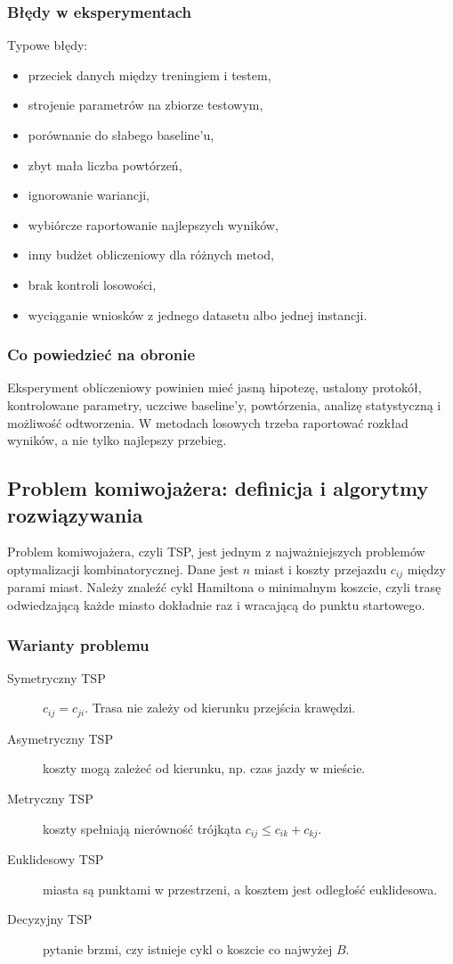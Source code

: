 \subsubsection{Błędy w eksperymentach}

Typowe błędy:
\begin{itemize}
  \item przeciek danych między treningiem i testem,
  \item strojenie parametrów na zbiorze testowym,
  \item porównanie do słabego baseline'u,
  \item zbyt mała liczba powtórzeń,
  \item ignorowanie wariancji,
  \item wybiórcze raportowanie najlepszych wyników,
  \item inny budżet obliczeniowy dla różnych metod,
  \item brak kontroli losowości,
  \item wyciąganie wniosków z jednego datasetu albo jednej instancji.
\end{itemize}

\subsubsection{Co powiedzieć na obronie}

Eksperyment obliczeniowy powinien mieć jasną hipotezę, ustalony protokół, kontrolowane parametry, uczciwe baseline'y, powtórzenia, analizę statystyczną i możliwość odtworzenia. W metodach losowych trzeba raportować rozkład wyników, a nie tylko najlepszy przebieg.

\subsection{Problem komiwojażera: definicja i algorytmy rozwiązywania}

Problem komiwojażera, czyli TSP, jest jednym z najważniejszych problemów optymalizacji kombinatorycznej. Dane jest $n$ miast i koszty przejazdu $c_{ij}$ między parami miast. Należy znaleźć cykl Hamiltona o minimalnym koszcie, czyli trasę odwiedzającą każde miasto dokładnie raz i wracającą do punktu startowego.

\subsubsection{Warianty problemu}

\begin{description}
  \item[Symetryczny TSP] $c_{ij}=c_{ji}$. Trasa nie zależy od kierunku przejścia krawędzi.
  \item[Asymetryczny TSP] koszty mogą zależeć od kierunku, np. czas jazdy w mieście.
  \item[Metryczny TSP] koszty spełniają nierówność trójkąta $c_{ij}\le c_{ik}+c_{kj}$.
  \item[Euklidesowy TSP] miasta są punktami w przestrzeni, a kosztem jest odległość euklidesowa.
  \item[Decyzyjny TSP] pytanie brzmi, czy istnieje cykl o koszcie co najwyżej $B$.
\end{description}

